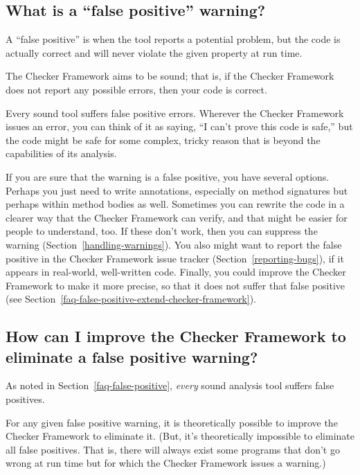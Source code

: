 \subsection{What is a ``false positive'' warning?\label{faq-false-positive}}

A ``false positive'' is when the tool reports a potential problem, but the
code is actually correct and will never violate the given property at run
time.

The Checker Framework aims to be sound; that is, if the Checker Framework
does not report any possible errors, then your code is correct.

Every sound tool suffers false positive errors.
Wherever the Checker Framework issues an error, you can think of it as
saying, ``I can't prove this code is safe,'' but the code might be safe for
some complex, tricky reason that is beyond the capabilities of its
analysis.

If you are sure that the warning is a false positive, you have several
options.
Perhaps you just need to write annotations, especially on method signatures
but perhaps within method bodies as well.
Sometimes you can rewrite the code in a clearer way that the Checker
Framework can verify, and that might be easier for people to understand, too.
If these don't work, then you can suppress the warning
(Section~\ref{handling-warnings}).
You also might want to report
the false positive in the Checker Framework issue tracker
(Section~\ref{reporting-bugs}), if it appears in real-world, well-written code.
%
Finally, you could improve the Checker Framework to make it more
precise, so that it does not suffer that false positive (see
Section~\ref{faq-false-positive-extend-checker-framework}).


\subsection{How can I improve the Checker Framework to eliminate a false positive warning?\label{faq-false-positive-extend-checker-framework}}

As noted in Section~\ref{faq-false-positive}, \emph{every} sound analysis
tool suffers false positives.

For any given false positive warning, it is theoretically possible to
improve the Checker Framework to eliminate it.  (But, it's theoretically
impossible to eliminate all false positives.  That is, there
will always exist some programs that don't go wrong at run time but for
which the Checker Framework issues a warning.)

